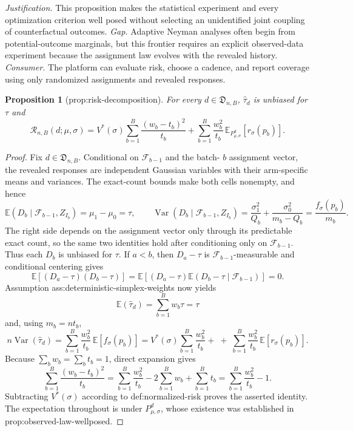 \documentclass{article}
\newtheorem{proposition}{Proposition}
\begin{document}
\par\smallskip\noindent \textit{Justification.} This proposition makes the statistical experiment and every optimization criterion well posed without selecting an unidentified joint coupling of counterfactual outcomes. \textit{Gap.} Adaptive Neyman analyses often begin from potential-outcome marginals, but this frontier requires an explicit observed-data experiment because the assignment law evolves with the revealed history. \textit{Consumer.} The platform can evaluate risk, choose a cadence, and report coverage using only randomized assignments and revealed responses.

\begin{proposition}[prop:risk-decomposition]\label{prop:risk-decomposition}
For every \(d\in\mathfrak D_{n,B}\), \(\widehat\tau_d\) is unbiased for \(\tau\) and \[\mathcal R_{n,B}(d;\mu,\sigma)=V^*(\sigma)\sum_{b=1}^B\frac{(w_b-t_b)^2}{t_b}+\sum_{b=1}^B\frac{w_b^2}{t_b}\,\mathbb E_{P^{d}_{\mu,\sigma}}[r_\sigma(p_b)].\]
\end{proposition}
\begin{proof}
Fix \(d\in\mathfrak D_{n,B}\).  Conditional on \(\mathcal F_{b-1}\) and the batch-
\(b\) assignment vector, the revealed responses are independent Gaussian variables with their arm-specific means and variances.  The exact-count bounds make both cells nonempty, and hence
\[
\mathbb E(D_b\mid\mathcal F_{b-1},Z_{I_b})=\mu_1-\mu_0=\tau,
\qquad
\operatorname{Var}(D_b\mid\mathcal F_{b-1},Z_{I_b})
=\frac{\sigma_1^2}{Q_b}+\frac{\sigma_0^2}{m_b-Q_b}
=\frac{f_\sigma(p_b)}{m_b}.
\]
The right side depends on the assignment vector only through its predictable exact count, so the same two identities hold after conditioning only on \(\mathcal F_{b-1}\).  Thus each \(D_b\) is unbiased for \(\tau\).  If \(a<b\), then \(D_a-\tau\) is \(\mathcal F_{b-1}\)-measurable and conditional centering gives
\[
\mathbb E[(D_a-\tau)(D_b-\tau)]
=\mathbb E\!\left[(D_a-\tau)\mathbb E(D_b-\tau\mid\mathcal F_{b-1})\right]=0.
\]
Assumption ass:deterministic-simplex-weights now yields
\[
\mathbb E(\widehat\tau_d)=\sum_{b=1}^Bw_b\tau=\tau
\]
and, using \(m_b=nt_b\),
\[
n\operatorname{Var}(\widehat\tau_d)
=\sum_{b=1}^B\frac{w_b^2}{t_b}\,\mathbb E[f_\sigma(p_b)]
=V^*(\sigma)\sum_{b=1}^B\frac{w_b^2}{t_b}
+\; +\;\sum_{b=1}^B\frac{w_b^2}{t_b}\,\mathbb E[r_\sigma(p_b)].
\]
Because \(\sum_bw_b=\sum_bt_b=1\), direct expansion gives
\[
\sum_{b=1}^B\frac{(w_b-t_b)^2}{t_b}
=\sum_{b=1}^B\frac{w_b^2}{t_b}-2\sum_{b=1}^Bw_b+\sum_{b=1}^Bt_b
=\sum_{b=1}^B\frac{w_b^2}{t_b}-1.
\]
Subtracting \(V^*(\sigma)\) according to def:normalized-risk proves the asserted identity.  The expectation throughout is under \(P^d_{\mu,\sigma}\), whose existence was established in prop:observed-law-wellposed.
\end{proof}
\end{document}
